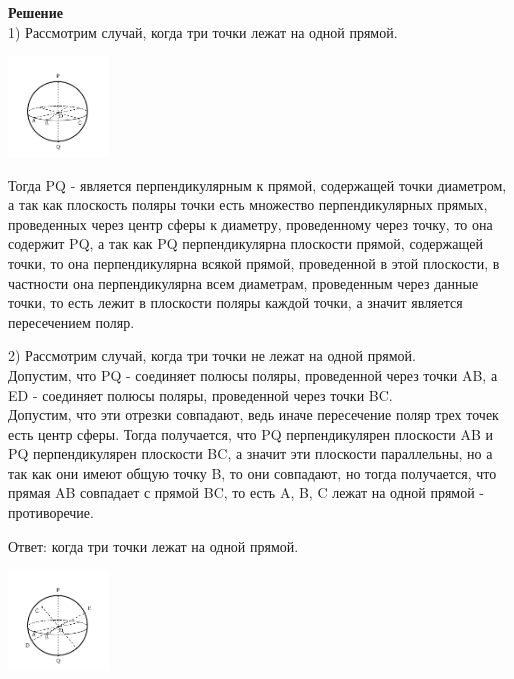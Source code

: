     \textbf{Решение}\\

    1) Рассмотрим случай, когда три точки лежат на одной прямой.

    \begin{center}
        \includegraphics[width=0.2\textwidth]{images/Frame 70}\\
    \end{center}

    Тогда PQ - является перпендикулярным к прямой, содержащей точки диаметром,
    а так как плоскость поляры точки есть множество перпендикулярных прямых,
    проведенных через центр сферы к диаметру, проведенному через точку, то она содержит PQ, а так как PQ
    перпендикулярна плоскости прямой, содержащей точки, то она перпендикулярна
    всякой прямой, проведенной в этой плоскости, в частности она перпендикулярна всем диаметрам,
    проведенным через данные точки, то есть лежит в плоскости поляры каждой точки, а
    значит является пересечением поляр.

    2) Рассмотрим случай, когда три точки не лежат на одной прямой.\\

    Допустим, что PQ - соединяет полюсы поляры, проведенной через точки AB, а
    ED - соединяет полюсы поляры, проведенной через точки BC.\\

    Допустим, что эти отрезки совпадают, ведь иначе пересечение поляр трех точек есть центр сферы.
    Тогда получается, что PQ перпендикулярен плоскости AB и PQ перпендикулярен плоскости BC,
    а значит эти плоскости параллельны, но а так как они имеют общую точку B, то они совпадают,
    но тогда получается, что прямая AB совпадает с прямой BC, то есть A, B, C лежат на одной прямой - противоречие.

    Ответ: когда три точки лежат на одной прямой.
    \begin{center}
        \includegraphics[width=0.2\textwidth]{images/Frame 71}\\
    \end{center}\\


